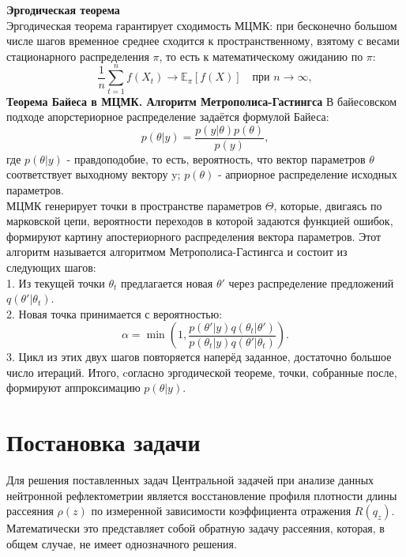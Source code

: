 \documentclass[a4paper]{article}
\begin{document}
\textbf{Эргодическая теорема}\\
Эргодическая теорема гарантирует сходимость МЦМК: при бесконечно большом числе шагов временное среднее сходится к пространственному, взятому с весами стационарного распределения $\pi$, то есть к математическому ожиданию по $\pi$:
\begin{equation}
    \frac{1}{n} \sum_{t=1}^n f(X_t) \to \mathbb{E}_\pi[f(X)] \quad \text{при } n \to \infty,
\end{equation}
\textbf{Теорема Байеса в МЦМК. Алгоритм Метрополиса-Гастингса}
В байесовском подходе апорстериорное распределение задаётся формулой Байеса:
\begin{equation}
    p(\theta | y) = \frac{p(y | \theta)p(\theta)}{p(y)},
\end{equation}
где $p(\theta | y)$ - правдоподобие, то есть, вероятность, что вектор параметров $\theta$ соответствует выходному вектору y; $p(\theta)$ - априорное распределение исходных параметров.\cite{4, 12} \\
МЦМК генерирует точки в пространстве параметров $\Theta$, которые, двигаясь по марковской цепи, вероятности переходов в которой задаются функцией ошибок, формируют картину апостериорного распределения вектора параметров. Этот алгоритм называется алгоритмом Метрополиса-Гастингса и состоит из следующих шагов\cite{4}:\\
1. Из текущей точки $\theta_t$ предлагается новая $\theta'$ через распределение предложений $q(\theta' | \theta_t)$.\\
2. Новая точка принимается с вероятностью:
$$
\alpha = \min\left(1, \frac{p(\theta' | y)q(\theta_t | \theta')}{p(\theta_t | y)q(\theta' | \theta_t)}\right).
$$
3. Цикл из этих двух шагов повторяется наперёд заданное, достаточно большое число итераций. Итого, cогласно эргодической теореме, точки, собранные после, формируют аппроксимацию $p(\theta | y)$. 


\bigskip

\section{Постановка задачи}
Для решения поставленных задач
Центральной задачей при анализе данных нейтронной рефлектометрии является восстановление профиля плотности длины рассеяния $\rho(z)$ по измеренной зависимости коэффициента отражения $R(q_z)$. Математически это представляет собой обратную задачу рассеяния, которая, в общем случае, не имеет однозначного решения.
\end{document}
